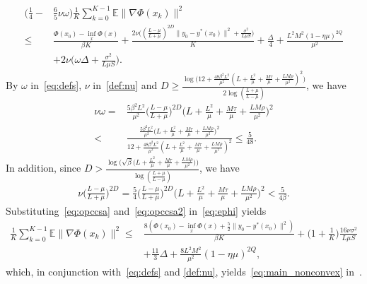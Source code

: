 \documentclass{osudissert96}
\begin{document}
\begin{align}\label{eq:ephi}
 \Big(\frac{1}{4} -&\frac{6}{5}\nu\omega\Big) \frac{1}{K}\sum_{k=0}^{K-1}\mathbb{E}\|\nabla\Phi(x_k)\|^2 \nonumber
 \\\leq &\frac{\Phi(x_0)-\inf_x\Phi(x)}{\beta K}+\frac{2\nu\big((\frac{L-\mu}{L+\mu})^{2D}\|y_0-y^*(x_0)\|^2 + \frac{\sigma^2}{L\mu S}\big)}{K}+\frac{ \Delta}{4} +  \frac{ L^2M^2(1-\eta \mu)^{2Q}}{\mu^2}  \nonumber
 \\&+ 2\nu\Big(\omega\Delta +\frac{\sigma^2}{L\mu S}\Big).
\end{align}
By $\omega$ in~\cref{eq:defs}, $\nu$ in~\cref{def:nu} and $D\geq \frac{\log \big(12+  \frac{48\beta^2L^2}{\mu^2} ( L+\frac{L^2}{\mu} + \frac{M\tau}{\mu}+\frac{LM\rho}{\mu^2})^2\big)}{2\log (\frac{L+\mu}{L-\mu})}$, we have
\begin{align}\label{eq:opccsa}
\nu\omega = &\frac{5\beta^2L^2}{\mu^2} \Big(\frac{L-\mu}{L+\mu}\Big)^{2D}\Big( L+\frac{L^2}{\mu} + \frac{M\tau}{\mu}+\frac{LM\rho}{\mu^2}\Big)^2\nonumber
\\<& \frac{\frac{5\beta^2L^2}{\mu^2} \Big( L+\frac{L^2}{\mu} + \frac{M\tau}{\mu}+\frac{LM\rho}{\mu^2}\Big)^2}{12+  \frac{48\beta^2L^2}{\mu^2} ( L+\frac{L^2}{\mu} + \frac{M\tau}{\mu}+\frac{LM\rho}{\mu^2})^2} \leq \frac{5}{48}.
\end{align}
In addition, since $D>\frac{\log \big(\sqrt{\beta}\big(L+\frac{L^2}{\mu} + \frac{M\tau}{\mu}+\frac{LM\rho}{\mu^2}\big)\big)}{\log (\frac{L+\mu}{L-\mu})}$, we have
\begin{align}\label{eq:opccsa2}
 \nu\Big(\frac{L-\mu}{L+\mu}\Big)^{2D} =  \frac{5}{4}\Big(\frac{L-\mu}{L+\mu}\Big)^{2D}\Big( L+\frac{L^2}{\mu} + \frac{M\tau}{\mu}+\frac{LM\rho}{\mu^2}\Big)^2 <\frac{5}{4\beta}.
\end{align}
Substituting~\cref{eq:opccsa} and~\cref{eq:opccsa2} in~\cref{eq:ephi} yields 
\begin{align*}
\frac{1}{K}\sum_{k=0}^{K-1}\mathbb{E}\|\nabla\Phi(x_k)\|^2 \leq & \frac{8(\Phi(x_0)-\inf_x\Phi(x)+\frac{5}{2}\|y_0-y^*(x_0)\|^2) }{\beta K}+\Big(1+\frac{1}{K}\Big)\frac{16\nu\sigma^2}{L\mu S} \nonumber
\\&+\frac{11}{3} \Delta+  \frac{8L^2M^2}{\mu^2}(1-\eta \mu)^{2Q}, 
\end{align*}
which, in conjunction with~\cref{eq:defs} and \cref{def:nu}, yields~\cref{eq:main_nonconvex} in~.  

\end{document}
